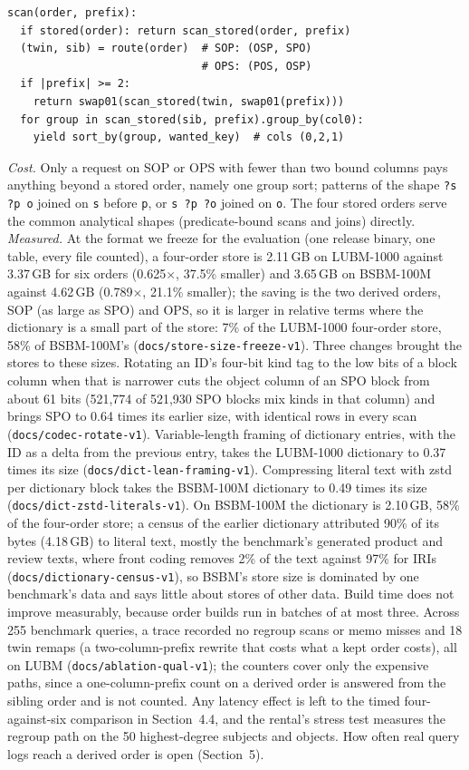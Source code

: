 \documentclass[sigconf, nonacm]{acmart}
\begin{document}
\begin{footnotesize}
\begin{verbatim}
scan(order, prefix):
  if stored(order): return scan_stored(order, prefix)
  (twin, sib) = route(order)  # SOP: (OSP, SPO)
                              # OPS: (POS, OSP)
  if |prefix| >= 2:
    return swap01(scan_stored(twin, swap01(prefix)))
  for group in scan_stored(sib, prefix).group_by(col0):
    yield sort_by(group, wanted_key)  # cols (0,2,1)
\end{verbatim}
\end{footnotesize}
\emph{Cost.} Only a request on SOP or OPS with fewer than two bound columns pays anything beyond a stored order, namely one group sort; patterns of the shape \texttt{?s ?p o} joined on \texttt{s} before \texttt{p}, or \texttt{s ?p ?o} joined on \texttt{o}. The four stored orders serve the common analytical shapes (predicate-bound scans and joins) directly.
\emph{Measured.} At the format we freeze for the evaluation (one release binary, one table, every file counted), a four-order store is 2.11\,GB on LUBM-1000 against 3.37\,GB for six orders (0.625$\times$, 37.5\% smaller) and 3.65\,GB on BSBM-100M against 4.62\,GB (0.789$\times$, 21.1\% smaller); the saving is the two derived orders, SOP (as large as SPO) and OPS, so it is larger in relative terms where the dictionary is a small part of the store: 7\% of the LUBM-1000 four-order store, 58\% of BSBM-100M's (\texttt{docs/store-size-freeze-v1}). Three changes brought the stores to these sizes. Rotating an ID's four-bit kind tag to the low bits of a block column when that is narrower cuts the object column of an SPO block from about 61 bits (521,774 of 521,930 SPO blocks mix kinds in that column) and brings SPO to 0.64 times its earlier size, with identical rows in every scan (\texttt{docs/codec-rotate-v1}). Variable-length framing of dictionary entries, with the ID as a delta from the previous entry, takes the LUBM-1000 dictionary to 0.37 times its size (\texttt{docs/dict-lean-framing-v1}). Compressing literal text with zstd per dictionary block takes the BSBM-100M dictionary to 0.49 times its size (\texttt{docs/dict-zstd-literals-v1}). On BSBM-100M the dictionary is 2.10\,GB, 58\% of the four-order store; a census of the earlier dictionary attributed 90\% of its bytes (4.18\,GB) to literal text, mostly the benchmark's generated product and review texts, where front coding removes 2\% of the text against 97\% for IRIs (\texttt{docs/dictionary-census-v1}), so BSBM's store size is dominated by one benchmark's data and says little about stores of other data. Build time does not improve measurably, because order builds run in batches of at most three. Across 255 benchmark queries, a trace recorded no regroup scans or memo misses and 18 twin remaps (a two-column-prefix rewrite that costs what a kept order costs), all on LUBM (\texttt{docs/ablation-qual-v1}); the counters cover only the expensive paths, since a one-column-prefix count on a derived order is answered from the sibling order and is not counted. Any latency effect is left to the timed four-against-six comparison in Section~4.4, and the rental's stress test measures the regroup path on the 50 highest-degree subjects and objects. How often real query logs reach a derived order is open (Section~5).
\end{document}
